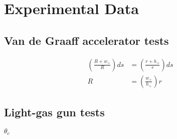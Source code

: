 
\chapter{Experimental Data}
\label{ch.ExperimentData}

\section{Van de Graaff accelerator tests}
\begin{align}
\left(\frac{R+w_+}{R}\right)ds &= \left(\frac{r+h_+}{r}\right)ds \\
R &= \left(\frac{w_+}{h_+}\right)r
\end{align}

\section{Light-gas gun tests}
$\theta_c$
